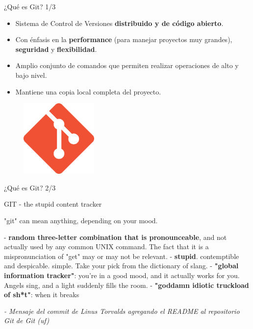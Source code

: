 \begin{frame}{¿Qué es Git? 1/3}

	\begin{block}{}
 \begin{itemize}
     	\item Sistema de Control de Versiones \textbf{distribuido y de código abierto}.
  
        \item Con énfasis en la \textbf{performance} (para manejar proyectos muy grandes), \textbf{seguridad} y \textbf{flexibilidad}.
        
        \item Amplio conjunto de comandos que permiten realizar operaciones de alto y bajo nivel.

        \item Mantiene una copia local completa del proyecto.
 \end{itemize}

	\end{block}

    \begin{figure}[ht]
        \begin{center}
            \includegraphics[height=1.5in]{images/logo-git.png}
        \end{center}
    \end{figure}
\end{frame}

\begin{frame}{¿Qué es Git? 2/3}
    \begin{center}
        \begin{block}{GIT - the stupid content tracker}

            "git" can mean anything, depending on your mood.
            
             - \textbf{random three-letter combination that is pronounceable}, and not actually used by any common UNIX command.  The fact that it is a mispronunciation of "get" may or may not be relevant.\newline
             - \textbf{stupid}. contemptible and despicable. simple. Take your pick from the dictionary of slang.\newline
             - \textbf{"global information tracker"}: you're in a good mood, and it actually works for you. Angels sing, and a light suddenly fills the room. \newline
             - \textbf{"goddamn idiotic truckload of sh*t"}: when it breaks
        \end{block}
    \end{center}
    \pause
    \textit{ - Mensaje del commit de Linus Torvalds agregando el README al repositorio Git de Git (uf)}
    
\end{frame}


